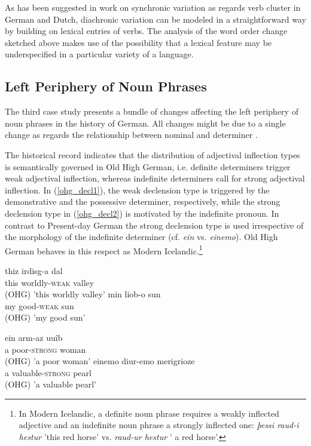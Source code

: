 \documentclass[output=paper]{langsci/langscibook}
\begin{document}
As has been suggested in work on synchronic variation as regards verb cluster in German and Dutch, diachronic variation can be modeled in a straightforward way by building on lexical entries of verbs. The analysis of the word order change sketched above makes use of the possibility that a lexical feature may be underspecified in a particular variety of a language.

\subsection{Left Periphery of Noun Phrases \label{NP}}

The third case study presents a bundle of changes affecting the left periphery of noun phrases in the history of German. All changes might be due to a single change as regards the relationship between nominal and determiner \citep{demske2001}.

The historical record indicates that the distribution of adjectival inflection types is semantically governed in Old High German, i.e. definite determiners trigger weak adjectival inflection, whereas indefinite determiners call for strong adjectival inflection. In (\ref{ohg_decl1}), the weak declension type is triggered by the demonstrative and the possessive determiner, respectively, while the strong declension type in (\ref{ohg_decl2}) is motivated by the indefinite pronoun. In contrast to Present-day German the strong declension type is used irrespective of the morphology of the indefinite determiner (cf. \textit{ein} vs. \textit{einemo}). Old High German behaves in this respect as Modern Icelandic.\footnote{In Modern Icelandic, a definite noun phrase requires a weakly inflected adjective and an indefinite noun phrase a strongly inflected one: \textit{þessi raud-i hestur} 'this red horse' vs. \textit{raud-ur hestur} ' a red horse'.} 

      
\eal \label{ohg_decl1}
\ex
\gll thiz irdisg-a dal \\  this worldly-\textsc{weak}{} valley \\ \hfill (OHG)
\glt 'this worldly valley'
\ex
\gll min liob-o sun \\ my good-\textsc{weak} sun \\  \hfill (OHG)
\glt 'my good sun'
\zl

\eal \label{ohg_decl2}
\ex 
\gll ein arm-az uuîb \\ a poor-\textsc{strong} woman \\ \hfill (OHG)
\glt 'a poor woman'
\ex 
\gll einemo diur-emo merigrioze \\ a valuable-\textsc{strong} pearl \\ \hfill (OHG)
\glt 'a valuable pearl'
\end{document}
